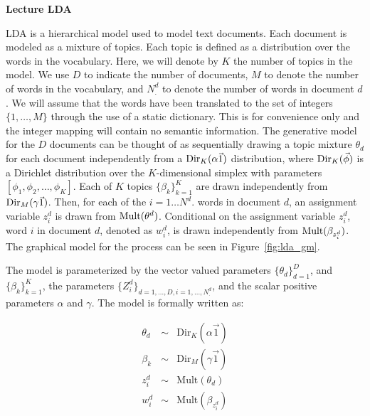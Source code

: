 \documentclass[11pt]{amsart}
\begin{document}
\begin{center}
	{\bf Lecture LDA}\\
\end{center}

LDA is a hierarchical model used to model text documents.  Each document is modeled as a mixture of topics.  Each topic is defined as a distribution over the words in the vocabulary.  Here, we will denote by $K$ the number of topics in the model.  We use $D$ to indicate the number of documents, $M$ to denote the number of words in the vocabulary, and $N^d_.$ to denote the number of words in document $d$.  We will assume that the words have been translated to the set of integers $\{1, \ldots, M\}$ through the use of a static dictionary.  This is for convenience only and the integer mapping will contain no semantic information.  The generative model for the $D$ documents can be thought of as sequentially drawing a topic mixture $\theta_d$ for each document independently from a ${\rm Dir}_K(\alpha \vec 1)$ distribution, where ${\rm Dir}_K(\vec \phi)$ is a Dirichlet distribution over the $K$-dimensional simplex with parameters $[\phi_1, \phi_2, \ldots, \phi_K]$.  Each of $K$ topics $\{\beta_k\}_{k = 1}^K$ are drawn independently from ${\rm Dir}_M(\gamma \vec 1)$.  Then, for each of the $i = 1 \ldots N^d.$ words in document $d$, an assignment variable $z^d_i$ is drawn from ${\rm Mult}(\theta^d)$.  Conditional on the assignment variable $z_i^d$, word $i$ in document $d$, denoted as $w^d_i$, is drawn independently from ${\rm Mult}(\beta_{z^d_i})$.  The graphical model for the process can be seen in Figure~\ref{fig:lda_gm}.

\begin{figure*}[ttt!!!] 
  \begin{center}
    \caption{Graphical model for LDA model}
    \label{fig:lda_gm}

    \end{center} 
\end{figure*} 

The model is parameterized by the vector valued parameters $\{\theta_d\}_{d = 1}^D$, and $\{\beta_k\}_{k = 1}^K$, the parameters $\{Z_i^d\}_{d = 1, \ldots, D, i = 1, \ldots, N_.^d}$, and the scalar positive parameters $\alpha$ and $\gamma$.  The model is formally written as:

\begin{eqnarray*}
  \theta_d &\sim& \textrm{Dir}_K(\alpha \vec 1)\\
  \beta_k &\sim& \textrm{Dir}_M(\gamma \vec 1)\\
  z^d_i &\sim& \textrm{Mult}(\theta_d)\\
  w^d_i &\sim& \textrm{Mult}(\beta_{z^d_i})
\end{eqnarray*}
\end{document}
